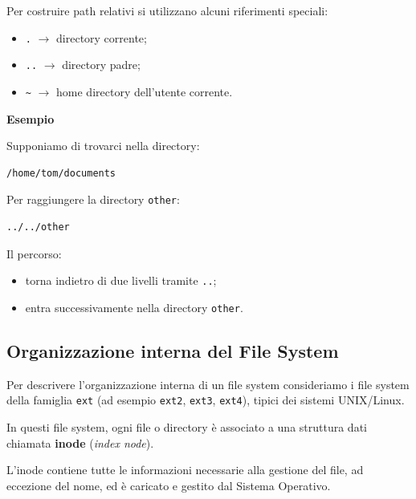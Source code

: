 \medskip

Per costruire path relativi si utilizzano alcuni riferimenti speciali:

\begin{itemize}
    \item \texttt{.} $\rightarrow$ directory corrente;
    
    \item \texttt{..} $\rightarrow$ directory padre;
    
    \item \texttt{\textasciitilde} $\rightarrow$ home directory dell’utente corrente.
\end{itemize}

\bigskip

\noindent
\textbf{Esempio}

Supponiamo di trovarci nella directory:

\begin{verbatim}
/home/tom/documents
\end{verbatim}

\noindent
Per raggiungere la directory \texttt{other}:

\begin{verbatim}
../../other
\end{verbatim}

\noindent
Il percorso:
\begin{itemize}
    \item torna indietro di due livelli tramite \texttt{..};
    
    \item entra successivamente nella directory \texttt{other}.
\end{itemize}
\subsection{Organizzazione interna del File System}
Per descrivere l’organizzazione interna di un file system consideriamo i file system della famiglia \texttt{ext} (ad esempio \texttt{ext2}, \texttt{ext3}, \texttt{ext4}), tipici dei sistemi UNIX/Linux.
\medskip

\noindent In questi file system, ogni file o directory è associato a una struttura dati chiamata \textbf{inode} (\textit{index node}).

\noindent L’inode contiene tutte le informazioni necessarie alla gestione del file, ad eccezione del nome, ed è caricato e gestito dal Sistema Operativo.

\medskip

